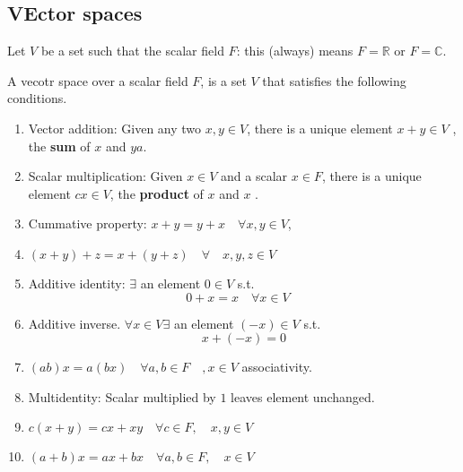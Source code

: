 \documentclass{article}
\theoremstyle{remark}
\begin{document}
 \subsection{VEctor spaces}%
 \label{sub:vector_spaces}

 Let $ V$ be a set such that the scalar field $F$: this (always) means  $F = \mathbb{R} $ or $F =\mathbb{C} $. 
 \begin{definition}
   A vecotr space over a scalar field $F$, is a set $V$ that satisfies the following conditions. 
   \begin{enumerate}
     \item Vector addition: Given any two $x,y \in V$, there is a unique element $x+y \in V$ , the \textbf{sum} of $x$ and $ya$.
     \item Scalar multiplication: Given $x \in V$ and a scalar $x \in F$, there is a unique element $cx \in V$, the \textbf{product}  of $x$ and $ x$ .
     \item Cummative property: $x+y = y +x \quad  \forall x,y \in  V $, 
     \item $\left( x+y \right) + z = x + \left( y+z \right) \quad  \forall \quad x,y,z \in  V  $
     \item Additive identity: $\exists$ an element $ 0 \in  V$ s.t. \[
     0 + x = x \quad  \forall x \in  V  \quad   
     \] 
   \item Additive inverse. $\forall x \in  V \exists$ an element $\left( -x \right) \in  V$ s.t. \[
   x+ \left( -x \right) = 0
   \] 
 \item  $\left( ab \right)x = a\left( bx \right)  \quad  \forall a,b \in F \quad  , x \in  V   $ associativity.
 \item Multidentity: Scalar multiplied by $1$ leaves element unchanged.
 \item $ c\left( x+y \right) = cx + xy \quad  \forall c \in  F , \quad    x,y \in  V $
 \item $\left( a + b \right)x = ax + bx \quad  \forall a,b  \in  F , \quad   x \in  V $

   \end{enumerate}
 \end{definition}
 
\end{document}
